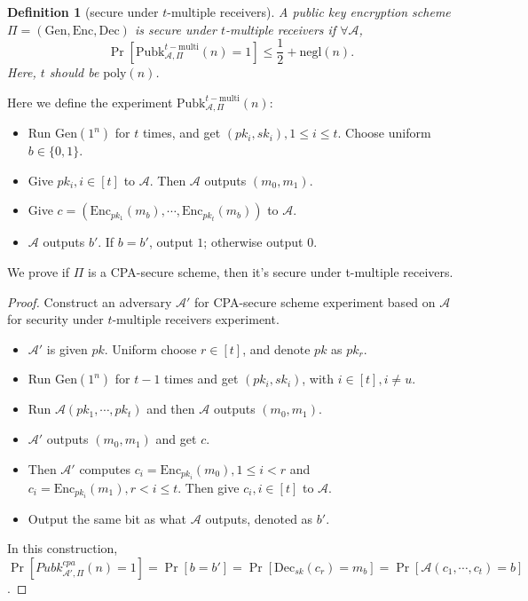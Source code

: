 \documentclass[a4paper]{article}
\newtheorem{definition}{Definition}
\newcommand{\poly}{\text{poly}}
\newcommand{\negl}{\text{negl}}
\newcommand{\Enc}{\text{Enc}}
\newcommand{\Dec}{\text{Dec}}
\newcommand{\Gen}{\text{Gen}}
\newcommand{\multi}{\text{multi}}
\newcommand{\Pubk}{\text{Pubk}}
\newcommand{\A}{\mathcal{A}}
\newenvironment{problem}[2][Problem]{\begin{trivlist}
\item[\hskip \labelsep {\bfseries #1}\hskip \labelsep {\bfseries #2.}]}{\end{trivlist}}
\begin{document}
\begin{problem}{11.13}
\begin{definition}[secure under $t$-multiple receivers]
A public key encryption scheme $\Pi=(\Gen,\Enc,\Dec)$ is secure under $t$-multiple receivers if $\forall \A$, $$\Pr[\Pubk_{\A,\Pi}^{t-\multi}(n)=1]\le\frac12+\negl(n).$$
Here, $t$ should be $\poly(n)$.
\end{definition}\par\vspace{2ex}
Here we define the experiment $\Pubk_{\A,\Pi}^{t-\multi}(n)$:\par
\begin{itemize}
    \item Run $\Gen(1^n)$ for $t$ times, and get $(pk_i,sk_i),1\le i\le t$. Choose uniform $b\in\{0,1\}$.
    \item Give $pk_i,i\in[t]$ to $\A$. Then $\A$ outputs $(m_0,m_1)$.
    \item Give $c=(\Enc_{pk_1}(m_b),\cdots,\Enc_{pk_t}(m_b))$ to $\A$.
    \item $\A$ outputs $b'$. If $b=b'$, output $1$; otherwise output $0$. 
\end{itemize}\par
We prove if $\Pi$ is a CPA-secure scheme, then it's secure under t-multiple receivers.\par
\begin{proof}
Construct an adversary $\A'$ for CPA-secure scheme experiment based on $\A$ for security under $t$-multiple receivers experiment.\par
\begin{itemize}
    \item $\A'$ is given $pk$. Uniform choose $r\in[t]$, and denote $pk$ as $pk_r$. 
    \item Run $\Gen(1^n)$ for $t-1$ times and get $(pk_i,sk_i)$, with $i\in[t],i\ne u$.
    \item Run $\A(pk_1, \cdots, pk_t)$ and then $\A$ outputs $(m_0,m_1)$.
    \item $\A'$ outputs $(m_0,m_1)$ and get $c$.
    \item Then $\A'$ computes $c_i=\Enc_{pk_i}(m_0), 1\le i<r$ and $c_i=\Enc_{pk_i}(m_1), r<i\le t$. Then give $c_i,i\in[t]$ to $\A$.
    \item Output the same bit as what $\A$ outputs, denoted as $b'$.
\end{itemize}\par
In this construction, $\Pr[Pubk_{\A',\Pi}^{cpa}(n)=1]=\Pr[b=b']=\Pr[\Dec_{sk}(c_r)=m_b]=\Pr[\A(c_1,\cdots,c_t)=b]$. \par

\end{proof}
\end{problem}
\end{document}

